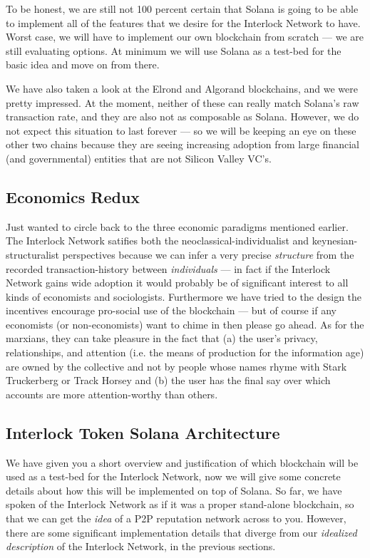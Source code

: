 \documentclass[a4paper]{article}
\begin{document}
To be honest, we are still not 100 percent certain that Solana is going to be able to implement all of the features that we desire for the Interlock Network to have. Worst case, we will have to implement our own blockchain from scratch ---  we are still evaluating options. At minimum we will use Solana as a test-bed for the basic idea and move on from there.

We have also taken a look at the Elrond and Algorand blockchains, and we were pretty impressed. At the moment, neither of these can really match Solana's raw transaction rate, and they are also not as composable as Solana. However, we do not expect this situation to last forever ---  so we will be keeping an eye on these other two chains because they are seeing increasing adoption from large financial (and governmental) entities that are not Silicon Valley VC's.
\subsection{Economics Redux}
\label{Economics Redux}

Just wanted to circle back to the three economic paradigms mentioned earlier. The Interlock Network satifies both the neoclassical-individualist and keynesian-structuralist perspectives because we can infer a very precise \emph{structure} from the recorded transaction-history between \emph{individuals} ---  in fact if the Interlock Network gains wide adoption it would probably be of significant interest to all kinds of economists and sociologists. Furthermore we have tried to the design the incentives encourage pro-social use of the blockchain ---  but of course if any economists (or non-economists) want to chime in then please go ahead. As for the marxians, they can take pleasure in the fact that (a) the user's privacy, relationships, and attention (i.e. the means of production for the information age) are owned by the collective and not by people whose names rhyme with Stark Truckerberg or Track Horsey and (b) the user has the final say over which accounts are more attention-worthy than others.
\subsection{Interlock Token Solana Architecture}
\label{Interlock Token Solana Architecture}

We have given you a short overview and justification of which blockchain will be used as a test-bed for the Interlock Network, now we will give some concrete details about how this will be implemented on top of Solana. So far, we have spoken of the Interlock Network as if it was a proper stand-alone blockchain, so that we can get the \emph{idea} of a P2P reputation network across to you. However, there are some significant implementation details that diverge from our \emph{idealized description} of the Interlock Network, in the previous sections.
\end{document}
